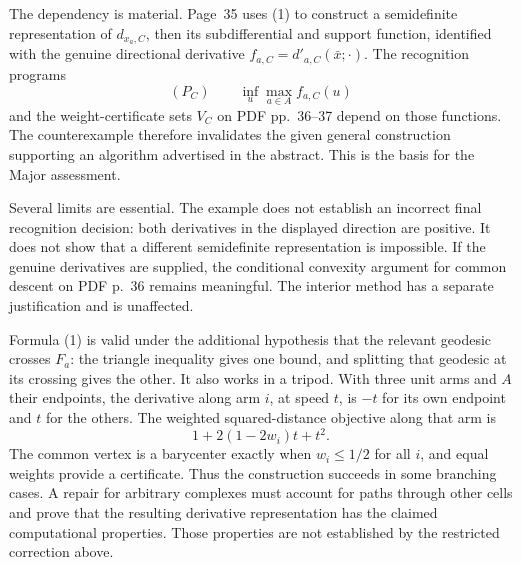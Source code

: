 \documentclass[10pt]{article}
\begin{document}
The dependency is material. Page 35 uses (1) to construct a semidefinite representation of \(d_{x_a,C}\), then its subdifferential and support function, identified with the genuine directional derivative \(f_{a,C}=d'_{a,C}(\bar x;\cdot)\). The recognition programs \[(P_C)\qquad \inf_u\max_{a\in A}f_{a,C}(u)\] and the weight-certificate sets \(V_C\) on PDF pp. 36–37 depend on those functions. The counterexample therefore invalidates the given general construction supporting an algorithm advertised in the abstract. This is the basis for the Major assessment.\par
Several limits are essential. The example does not establish an incorrect final recognition decision: both derivatives in the displayed direction are positive. It does not show that a different semidefinite representation is impossible. If the genuine derivatives are supplied, the conditional convexity argument for common descent on PDF p. 36 remains meaningful. The interior method has a separate justification and is unaffected.\par
Formula (1) is valid under the additional hypothesis that the relevant geodesic crosses \(F_a\): the triangle inequality gives one bound, and splitting that geodesic at its crossing gives the other. It also works in a tripod. With three unit arms and \(A\) their endpoints, the derivative along arm \(i\), at speed \(t\), is \(-t\) for its own endpoint and \(t\) for the others. The weighted squared-distance objective along that arm is \[1+2(1-2w_i)t+t^2.\] The common vertex is a barycenter exactly when \(w_i\le1/2\) for all \(i\), and equal weights provide a certificate. Thus the construction succeeds in some branching cases. A repair for arbitrary complexes must account for paths through other cells and prove that the resulting derivative representation has the claimed computational properties. Those properties are not established by the restricted correction above.\par
\end{document}
